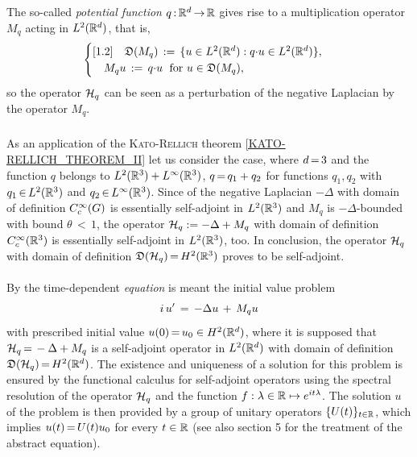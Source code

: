 \documentclass[11pt,twoside]{article}
\begin{document}
\begin{itemize}[leftmargin=9mm]
\subparagraph{} %
The so-called \textit{potential function} $q {\,:\,} {\mathbb{R}}^d {\,\to\,} {\mathbb{R}}$
gives rise to a multiplication operator $M_q$ acting in $L^2({\mathbb{R}}^d)$,
that is,
\[
\begin{cases}[1.2]
\quad \mathfrak{D}(M_q) \,:=\, \{u \in L^2({\mathbb{R}}^d): q {\cdot} u \in L^2({\mathbb{R}}^d)\},\\
\quad M_q u        \,:=\, q {\cdot} u \; \mbox{ for } u \in \mathfrak{D}(M_q)   ,\\
\end{cases}
\]
so the operator ${\mathcal{H}}_q$ can be seen as a perturbation
of the negative Laplacian by the operator $M_q$.

\subparagraph{} %
As an application of the \textsc{Kato-Rellich} theorem
\ref{KATO-RELLICH_THEOREM_II} let us consider the case,
where $d {\,=\,} 3$ and the function $q$ belongs to $L^2({\mathbb{R}}^3) + L^{\infty}({\mathbb{R}}^3)$,
{\ie}
$q {\,=\,} q_1 + q_2$ for functions $q_1, q_2$
with $q_1 {\,\in\,} L^2({\mathbb{R}}^3)$ and $q_2 {\,\in\,} L^{\infty}({\mathbb{R}}^3)$.
Since of the negative Laplacian $-\Delta$ with domain of definition $C_c^{\infty}(G)$
is essentially self-adjoint in $L^2({\mathbb{R}}^3)$
and $M_q$ is $-\Delta$-bounded with bound $\theta {\,<\,} 1$,
the operator ${\mathcal{H}}_q := -\Delta + M_q$
with domain of definition $C_c^{\infty}({\mathbb{R}}^3)$
is essentially self-adjoint in $L^2({\mathbb{R}}^3)$,
too.
In conclusion,
the operator ${\mathcal{H}}_q$ with domain of definition $\mathfrak{D}({\mathcal{H}}_q) {\,=\,} H^2({\mathbb{R}}^3)$
proves to be self-adjoint.

\paragraph{} %
By the time-dependent \textit{{\SCHROEDINGER} equation} is meant
the initial value problem
\[
i \, u' \,=\, -\Delta u \,+\, M_q u
\]
with prescribed initial value $u(0) {\,=\,} u_0 \in H^2({\mathbb{R}}^d)$,
where it is supposed that ${\mathcal{H}}_q {\,=\,} -\Delta + M_q$
is a self-adjoint operator in $L^2({\mathbb{R}}^d)$
with domain of definition $\mathfrak{D}({\mathcal{H}}_q) {\,=\,} H^2({\mathbb{R}}^d)$.
The existence and uniqueness of a solution for this problem is ensured
by the functional calculus for self-adjoint operators
using the spectral resolution of the operator ${\mathcal{H}}_q$
and the function $f:\lambda \in {\mathbb{R}} \mapsto e^{it \lambda}$.
The solution $u$ of the problem is then provided
by a group of unitary operators $\{U(t)\}_{t \in {\mathbb{R}}}$,
which implies $u(t) {\,=\,} U(t) u_0$ for every $t \in {\mathbb{R}}$
(see also section 5 for the treatment of the abstract {\SCHROEDINGER} equation).


\end{itemize}
\end{document}
